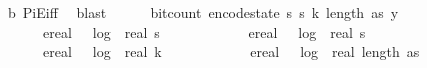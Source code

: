 \begin{isabellebody}
\ b{}\ PiE{\isacharunderscore}{\kern0pt}iff\ \isamarkupfalse%
\ blast\isanewline
\ \ \ \ \isamarkupfalse%
\ {\isachardoublequoteopen}bit{\isacharunderscore}{\kern0pt}count\ {\isacharparenleft}{\kern0pt}encode{\isacharunderscore}{\kern0pt}state\ {\isacharparenleft}{\kern0pt}s\ s\ k{\isacharcomma}{\kern0pt}\ length\ as{\isacharcomma}{\kern0pt}\ y{\isacharparenright}{\kern0pt}{\isacharparenright}{\kern0pt}\ {\isasymle}\ \isanewline
\ \ \ \ \ \ ereal\ {\isacharparenleft}{\kern0pt}{}\ {\isacharasterisk}{\kern0pt}\ log\ {}\ {\isacharparenleft}{\kern0pt}real\ s\ {\isacharplus}{\kern0pt}\ {}{\isacharparenright}{\kern0pt}\ {\isacharplus}{\kern0pt}\ {}{\isacharparenright}{\kern0pt}\ {\isacharplus}{\kern0pt}\ {\isacharparenleft}{\kern0pt}\isanewline
\ \ \ \ \ \ ereal\ {\isacharparenleft}{\kern0pt}{}\ {\isacharasterisk}{\kern0pt}\ log\ {}\ {\isacharparenleft}{\kern0pt}real\ s\ {\isacharplus}{\kern0pt}\ {}{\isacharparenright}{\kern0pt}\ {\isacharplus}{\kern0pt}\ {}{\isacharparenright}{\kern0pt}\ {\isacharplus}{\kern0pt}\ {\isacharparenleft}{\kern0pt}\ \isanewline
\ \ \ \ \ \ ereal\ {\isacharparenleft}{\kern0pt}{}\ {\isacharasterisk}{\kern0pt}\ log\ {}\ {\isacharparenleft}{\kern0pt}real\ k\ {\isacharplus}{\kern0pt}\ {}{\isacharparenright}{\kern0pt}\ {\isacharplus}{\kern0pt}\ {}{\isacharparenright}{\kern0pt}\ {\isacharplus}{\kern0pt}\ {\isacharparenleft}{\kern0pt}\isanewline
\ \ \ \ \ \ ereal\ {\isacharparenleft}{\kern0pt}{}\ {\isacharasterisk}{\kern0pt}\ log\ {}\ {\isacharparenleft}{\kern0pt}real\ {\isacharparenleft}{\kern0pt}length\ as{\isacharparenright}{\kern0pt}\ {\isacharplus}{\kern0pt}\ {}{\isacharparenright}{\kern0pt}\ {\isacharplus}{\kern0pt}\ {}{\isacharparenright}{\kern0pt}\ {\isacharplus}{\kern0pt}\ {\isacharparenleft}{\kern0pt}\isanewline

\end{isabellebody}
